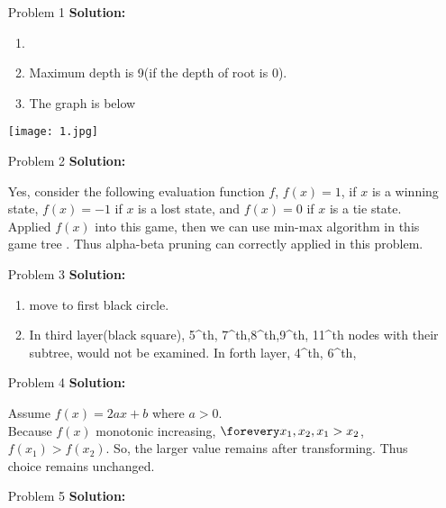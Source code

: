 \normalfont\documentclass[letterpaper,11pt]{article}
\begin{document}
\setlength{\parindent}{2ex}
\newcommand{\header}{
	\noindent {}
}
\bigskip
\header

\begin{enumerate}
\item[Problem 1]\textbf{Solution:}\par
	\begin{enumerate}
		\item
		\item Maximum depth is 9(if the depth of root is $0$).
		\item The graph is below\par
	\end{enumerate}
	\texttt{[image: 1.jpg]}
	
\item[Problem 2]\textbf{Solution:}\par
	Yes, consider the following evaluation function $f$, $f(x) = 1$, if $x$ is a winning state, $f(x) = -1$ if $x$ is a lost state, and $f(x) = 0$ if $x$ is a tie state. Applied $f(x)$ into this game, then we can use min-max algorithm in this game tree . Thus alpha-beta pruning can correctly applied in this problem.
\item [Problem 3]\textbf{Solution:}\par
	\begin{enumerate}
		Let's name the node in each layer by the order from left to right.
		\item move to first black circle.
		\item In third layer(black square), 5^{th}, 7^{th},8^{th},9^{th}, 11^{th} nodes with their subtree, would not be examined. In forth layer, 4^{th}, 6^{th},
	\end{enumerate}	
\item[Problem 4]\textbf{Solution:}\par
	Assume $f(x) = 2ax + b$ where $a > 0$.\\
	Because $f(x)$ monotonic increasing, $\forevery x_1,x_2, x_1 > x_2$, $f(x_1)> f(x_2)$. So, the larger value remains after transforming. Thus choice remains unchanged.
\item [Problem 5]\textbf{Solution:}\par


\end{enumerate}
\end{document}
